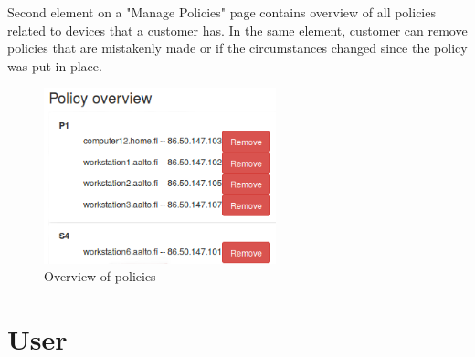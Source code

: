 Second element on a "Manage Policies" page contains overview of all policies related to devices that a customer has. In the same element, customer can remove policies that are mistakenly made or if the circumstances changed since the policy was put in place.

\begin{figure}[ht]
	\begin{center}
		\includegraphics[width=0.6\textwidth]{images/implementation/PolicyOverview}
		\caption{Overview of policies}
		\label{fig:PolicyOverview}
	\end{center}
\end{figure}

\section{User}




